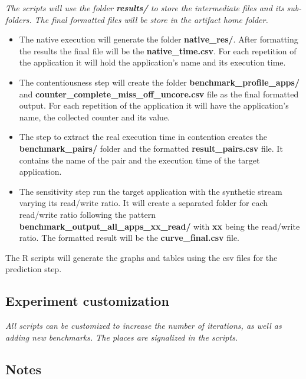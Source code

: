 \documentclass{sigplanconf}
\begin{document}
{{\em The scripts will use the folder {\bf results/} to store the intermediate files and its sub-folders. The final formatted files will be store in the artifact home folder.
\begin{itemize}
\item The native execution will generate the folder {\bf native\_res/}. After formatting the results the final file will be the {\bf native\_time.csv}. For each repetition of the application it will hold the application's name and its execution time.
\item The contentiousness step will create the folder {\bf benchmark\_profile\_apps/} and {\bf counter\_complete\_miss\_off\_uncore.csv} file as the final formatted output. For each repetition of the application it will have the application's name, the collected counter and its value.
\item The step to extract the real execution time in contention creates the {\bf benchmark\_pairs/} folder and the formatted {\bf result\_pairs.csv} file. It contains the name of the pair and the execution time of the target application.
\item The sensitivity step run the target application with the synthetic stream varying its read/write ratio. It will create a separated folder for each read/write ratio following the pattern {\bf benchmark\_output\_all\_apps\_xx\_read/} with {\bf xx} being the read/write ratio. The formatted result will be the {\bf curve\_final.csv} file.
\end{itemize}
The R scripts will generate the graphs and tables using the csv files for the prediction step.
}

\subsection{Experiment customization}

{\em All scripts can be customized to increase the number of iterations, as well as adding new benchmarks. The places are signalized in the scripts.
}

\subsection{Notes}

{\em }

}
\end{document}
